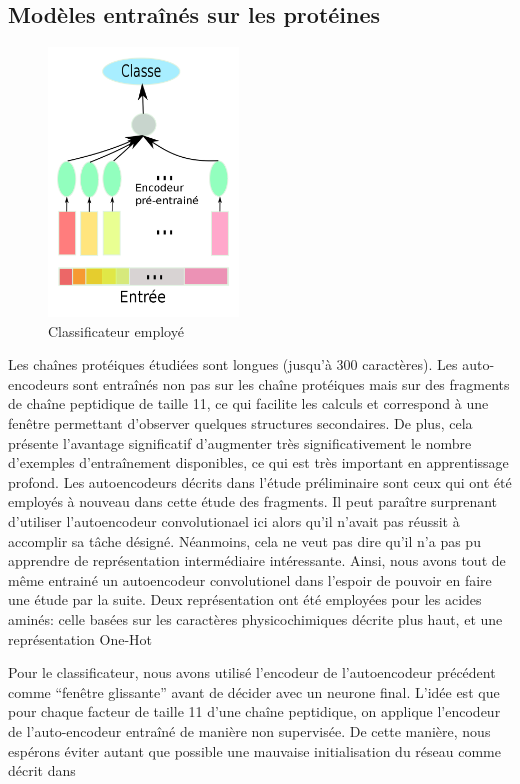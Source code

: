\documentclass[a4paper, 11pt, onecolumn]{article}
\begin{document}
\subsection{Modèles entraînés sur les protéines}

\begin{figure}
  \includegraphics[width=0.45\textwidth]{Class}
  \caption{Classificateur employé}
\end{figure}

Les chaînes protéiques étudiées sont longues (jusqu'à 300 caractères). Les
auto-encodeurs sont entraînés non pas sur les chaîne protéiques mais sur des
fragments de chaîne peptidique de taille 11, ce qui facilite les calculs et
correspond à une fenêtre permettant d'observer quelques structures secondaires.
De plus, cela présente l'avantage significatif d'augmenter très
significativement le nombre d'exemples d'entraînement disponibles, ce qui est
très important en apprentissage profond. Les autoencodeurs décrits dans l'étude
préliminaire sont ceux qui ont été employés à nouveau dans cette étude des
fragments. Il peut paraître surprenant d'utiliser l'autoencodeur convolutionael
ici alors qu'il n'avait pas réussit à accomplir sa tâche désigné. Néanmoins,
cela ne veut pas dire qu'il n'a pas pu apprendre de représentation intermédiaire
intéressante. Ainsi, nous avons tout de même entrainé un autoencodeur
convolutionel dans l'espoir de pouvoir en faire une étude par la suite. Deux
représentation ont été employées pour les acides aminés: celle basées sur les
caractères physicochimiques décrite plus haut, et une représentation One-Hot

Pour le classificateur, nous avons
utilisé l'encodeur de l'autoencodeur précédent comme ``fenêtre glissante''
avant de décider avec un neurone final. L'idée est que pour chaque facteur de
taille 11 d'une chaîne peptidique, on applique l'encodeur de l'auto-encodeur
entraîné de manière non supervisée. De cette manière, nous espérons éviter
autant que possible une mauvaise initialisation du réseau comme décrit dans \cite{vincent2010stacked}
\end{document}
